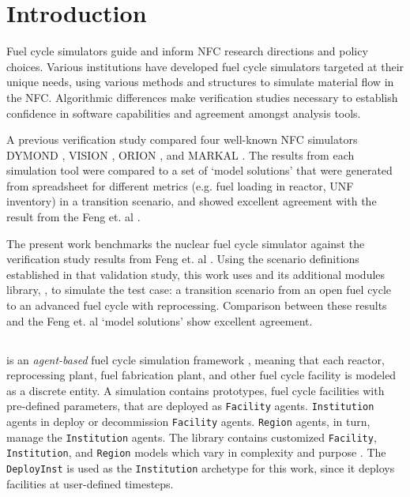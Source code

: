 
\section{Introduction}
Fuel cycle simulators guide and inform \gls{NFC} research directions and policy choices.
Various institutions have developed fuel cycle simulators targeted at their unique needs,
using various methods and structures
to simulate material flow in the \gls{NFC}.
Algorithmic differences make
verification studies necessary to establish
confidence in software capabilities and
agreement amongst analysis tools.

A previous verification study \cite{feng_standardized_2016} compared
four well-known \gls{NFC} simulators
DYMOND \cite{yacout_modeling_2005},
VISION \cite{jacobson_verifiable_2010},
ORION \cite{gregg_analysis_2012}, and
MARKAL \cite{shay_epa_2006}. The results from each simulation tool
were compared to a set of `model solutions' that were generated
from spreadsheet for different metrics (e.g. fuel loading in reactor,
\gls{UNF} inventory) in a transition scenario, and showed excellent agreement
with the result from the Feng et. al \cite{feng_standardized_2016}.

The present work benchmarks the \Cyclus nuclear fuel cycle simulator 
\cite{huff_fundamental_2016}
against the verification study results from Feng et. al 
\cite{feng_standardized_2016}.
Using the scenario definitions established in that validation study,
this work uses \Cyclus and its additional modules library, \Cycamore, to simulate the test case: a transition scenario from an
open fuel cycle to an advanced fuel cycle with
reprocessing. Comparison between these results and the Feng et. al `model solutions'
show excellent agreement.


\subsection{\Cyclus}

\Cyclus is an \emph{agent-based} fuel cycle simulation framework 
\cite{huff_fundamental_2016}, meaning 
that each reactor, reprocessing plant, fuel fabrication plant, and other fuel cycle
facility is modeled as a discrete entity.
A \Cyclus simulation contains prototypes, fuel cycle facilities with
pre-defined parameters, that are deployed as \texttt{Facility} agents.
\texttt{Institution} agents in \Cyclus deploy or decommission \texttt{Facility} agents.
\texttt{Region} agents, in turn, manage the \texttt{Institution}
agents.
The \Cycamore library contains customized \texttt{Facility}, 
\texttt{Institution}, and \texttt{Region} models which vary in complexity and purpose \cite{huff_extensions_2014}.
The \Cycamore \texttt{DeployInst} is used as the \texttt{Institution} archetype for this 
 work, since it deploys facilities at user-defined timesteps.
